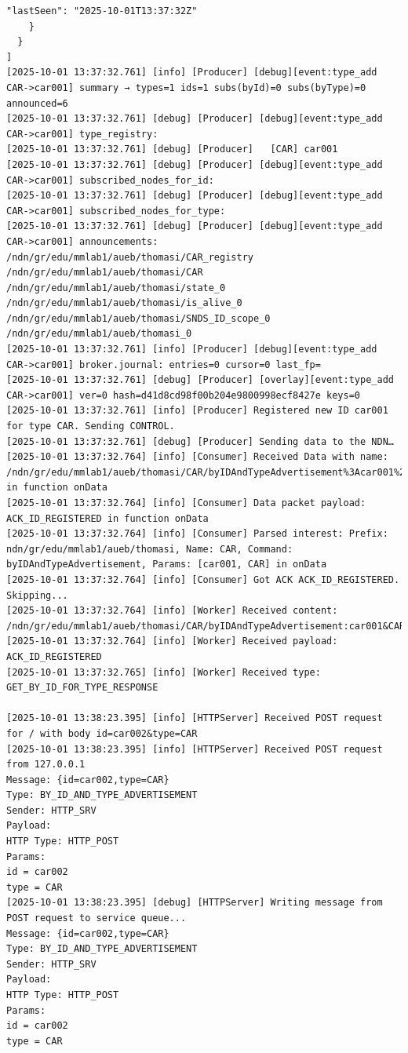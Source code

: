\documentclass{article}
\begin{document}
\begin{lstlisting}[language=log, caption={Producer SeEDS Service logs after publishing \textit{@ids=car001,car002} to the \textit{@type=CAR} registry}, label={lst:publish-to-registry}]
      "lastSeen": "2025-10-01T13:37:32Z"
    }
  }
]
[2025-10-01 13:37:32.761] [info] [Producer] [debug][event:type_add CAR->car001] summary → types=1 ids=1 subs(byId)=0 subs(byType)=0 announced=6
[2025-10-01 13:37:32.761] [debug] [Producer] [debug][event:type_add CAR->car001] type_registry:
[2025-10-01 13:37:32.761] [debug] [Producer]   [CAR] car001 
[2025-10-01 13:37:32.761] [debug] [Producer] [debug][event:type_add CAR->car001] subscribed_nodes_for_id:
[2025-10-01 13:37:32.761] [debug] [Producer] [debug][event:type_add CAR->car001] subscribed_nodes_for_type:
[2025-10-01 13:37:32.761] [debug] [Producer] [debug][event:type_add CAR->car001] announcements: /ndn/gr/edu/mmlab1/aueb/thomasi/CAR_registry /ndn/gr/edu/mmlab1/aueb/thomasi/CAR /ndn/gr/edu/mmlab1/aueb/thomasi/state_0 /ndn/gr/edu/mmlab1/aueb/thomasi/is_alive_0 /ndn/gr/edu/mmlab1/aueb/thomasi/SNDS_ID_scope_0 /ndn/gr/edu/mmlab1/aueb/thomasi_0 
[2025-10-01 13:37:32.761] [info] [Producer] [debug][event:type_add CAR->car001] broker.journal: entries=0 cursor=0 last_fp=
[2025-10-01 13:37:32.761] [debug] [Producer] [overlay][event:type_add CAR->car001] ver=0 hash=d41d8cd98f00b204e9800998ecf8427e keys=0
[2025-10-01 13:37:32.761] [info] [Producer] Registered new ID car001 for type CAR. Sending CONTROL.
[2025-10-01 13:37:32.761] [debug] [Producer] Sending data to the NDN…
[2025-10-01 13:37:32.764] [info] [Consumer] Received Data with name: /ndn/gr/edu/mmlab1/aueb/thomasi/CAR/byIDAndTypeAdvertisement%3Acar001%26CAR in function onData
[2025-10-01 13:37:32.764] [info] [Consumer] Data packet payload: ACK_ID_REGISTERED in function onData
[2025-10-01 13:37:32.764] [info] [Consumer] Parsed interest: Prefix: ndn/gr/edu/mmlab1/aueb/thomasi, Name: CAR, Command: byIDAndTypeAdvertisement, Params: [car001, CAR] in onData
[2025-10-01 13:37:32.764] [info] [Consumer] Got ACK ACK_ID_REGISTERED. Skipping...
[2025-10-01 13:37:32.764] [info] [Worker] Received content: /ndn/gr/edu/mmlab1/aueb/thomasi/CAR/byIDAndTypeAdvertisement:car001&CAR
[2025-10-01 13:37:32.764] [info] [Worker] Received payload: ACK_ID_REGISTERED
[2025-10-01 13:37:32.765] [info] [Worker] Received type: GET_BY_ID_FOR_TYPE_RESPONSE 

[2025-10-01 13:38:23.395] [info] [HTTPServer] Received POST request for / with body id=car002&type=CAR
[2025-10-01 13:38:23.395] [info] [HTTPServer] Received POST request from 127.0.0.1
Message: {id=car002,type=CAR}
Type: BY_ID_AND_TYPE_ADVERTISEMENT
Sender: HTTP_SRV
Payload: 
HTTP Type: HTTP_POST
Params:
id = car002
type = CAR
[2025-10-01 13:38:23.395] [debug] [HTTPServer] Writing message from POST request to service queue...
Message: {id=car002,type=CAR}
Type: BY_ID_AND_TYPE_ADVERTISEMENT
Sender: HTTP_SRV
Payload: 
HTTP Type: HTTP_POST
Params:
id = car002
type = CAR


\end{lstlisting}
\end{document}
